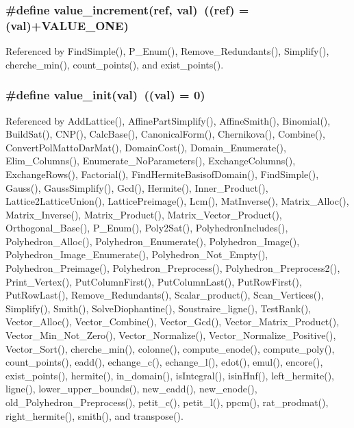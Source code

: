 \subsubsection{\setlength{\rightskip}{0pt plus 5cm}\#define value\_\-increment(ref, val)\ ((ref) = (val)+VALUE\_\-ONE)}\label{arithmetique_8h_a45}




Referenced by Find\-Simple(), P\_\-Enum(), Remove\_\-Redundants(), Simplify(), cherche\_\-min(), count\_\-points(), and exist\_\-points().

\subsubsection{\setlength{\rightskip}{0pt plus 5cm}\#define value\_\-init(val)\ ((val) = 0)}\label{arithmetique_8h_a10}




Referenced by Add\-Lattice(), Affine\-Part\-Simplify(), Affine\-Smith(), Binomial(), Build\-Sat(), CNP(), Calc\-Base(), Canonical\-Form(), Chernikova(), Combine(), Convert\-Pol\-Matto\-Dar\-Mat(), Domain\-Cost(), Domain\_\-Enumerate(), Elim\_\-Columns(), Enumerate\_\-No\-Parameters(), Exchange\-Columns(), Exchange\-Rows(), Factorial(), Find\-Hermite\-Basisof\-Domain(), Find\-Simple(), Gauss(), Gauss\-Simplify(), Gcd(), Hermite(), Inner\_\-Product(), Lattice2Lattice\-Union(), Lattice\-Preimage(), Lcm(), Mat\-Inverse(), Matrix\_\-Alloc(), Matrix\_\-Inverse(), Matrix\_\-Product(), Matrix\_\-Vector\_\-Product(), Orthogonal\_\-Base(), P\_\-Enum(), Poly2Sat(), Polyhedron\-Includes(), Polyhedron\_\-Alloc(), Polyhedron\_\-Enumerate(), Polyhedron\_\-Image(), Polyhedron\_\-Image\_\-Enumerate(), Polyhedron\_\-Not\_\-Empty(), Polyhedron\_\-Preimage(), Polyhedron\_\-Preprocess(), Polyhedron\_\-Preprocess2(), Print\_\-Vertex(), Put\-Column\-First(), Put\-Column\-Last(), Put\-Row\-First(), Put\-Row\-Last(), Remove\_\-Redundants(), Scalar\_\-product(), Scan\_\-Vertices(), Simplify(), Smith(), Solve\-Diophantine(), Soustraire\_\-ligne(), Test\-Rank(), Vector\_\-Alloc(), Vector\_\-Combine(), Vector\_\-Gcd(), Vector\_\-Matrix\_\-Product(), Vector\_\-Min\_\-Not\_\-Zero(), Vector\_\-Normalize(), Vector\_\-Normalize\_\-Positive(), Vector\_\-Sort(), cherche\_\-min(), colonne(), compute\_\-enode(), compute\_\-poly(), count\_\-points(), eadd(), echange\_\-c(), echange\_\-l(), edot(), emul(), encore(), exist\_\-points(), hermite(), in\_\-domain(), is\-Integral(), isin\-Hnf(), left\_\-hermite(), ligne(), lower\_\-upper\_\-bounds(), new\_\-eadd(), new\_\-enode(), old\_\-Polyhedron\_\-Preprocess(), petit\_\-c(), petit\_\-l(), ppcm(), rat\_\-prodmat(), right\_\-hermite(), smith(), and transpose().

